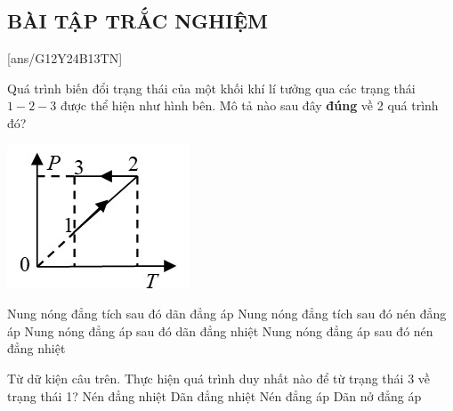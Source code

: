 \subsection{BÀI TẬP TRẮC NGHIỆM}
\setcounter{ex}{0}
[ans/G12Y24B13TN]
\begin{ex}
	Quá trình biến đổi trạng thái của một khối khí lí tưởng qua các trạng thái $1-2-3$ được thể hiện như hình bên. Mô tả nào sau đây \textbf{đúng} về 2 quá trình đó?
	\begin{center}
		\includegraphics[width=0.3\linewidth]{figs/VN12-Y24-PH-SYL-014P-9}
	\end{center}
	
	\choice
	{Nung nóng đẳng tích sau đó dãn đẳng áp}
	{\True Nung nóng đẳng tích sau đó nén đẳng áp}
	{Nung nóng đẳng áp sau đó dãn đẳng nhiệt}
	{Nung nóng đẳng áp sau đó nén đẳng nhiệt}
	\loigiai{}
\end{ex}
\begin{ex}
Từ dữ kiện câu trên. Thực hiện quá trình duy nhất nào để từ trạng thái 3 về trạng thái 1?	
	\choice
	{Nén đẳng nhiệt}
	{\True Dãn đẳng nhiệt}
	{Nén đẳng áp}
	{Dãn nở đẳng áp}
	\loigiai{}
\end{ex}
